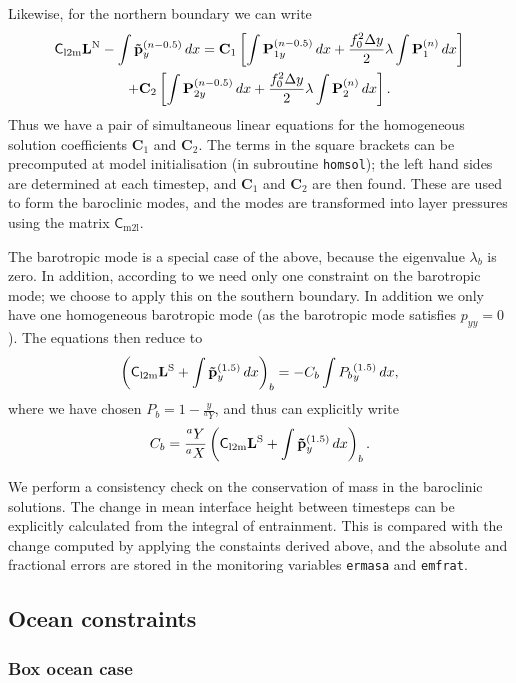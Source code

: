 \documentclass[11pt, a4paper,twoside]{article}
\newcommand{\vc}[1]{\mathbf{#1}}
\newcommand{\mtx}[1]{\vc{\mathsf{#1}}}
\newcommand{\cml}[0]{\mtx{C}_{\mathrm{m2l}}}
\newcommand{\clm}[0]{\mtx{C}_{\mathrm{l2m}}}
\numberwithin{equation}{section}
\begin{document}
Likewise, for the northern boundary we can write
\begin{multline}
\clm \vc{L}^{\textrm N} - \int \vc{\tilde{p}}_{y}^{(n-0.5)} \, dx =  \vc{C}_{1} \left[\int \vc{P}_{1y}^{(n-0.5)} \, dx + \frac{f_0^2 \Delta y}{2} \vc{\lambda} \int \vc{P}_{1}^{(n)}  \, dx\right] \\
+  \vc{C}_{2} \left[\int \vc{P}_{2y}^{(n-0.5)} \, dx  + \frac{f_0^2 \Delta y}{2} \vc{\lambda} \int \vc{P}_{2}^{(n)} \, dx \right] .
\end{multline}
Thus we have a pair of simultaneous linear equations for the homogeneous solution coefficients $\vc{C}_{1}$ and  $\vc{C}_{2}$.
The terms in the square brackets can be precomputed at model initialisation (in subroutine \verb=homsol=); the left hand sides are determined at each timestep, and  $\vc{C}_{1}$ and  $\vc{C}_{2}$ are then found.
These are used to form the baroclinic modes, and the modes are transformed into layer pressures using the matrix $\cml$.

The barotropic mode is a special case of the above, because the eigenvalue $\lambda_b$ is zero.
In addition, according to \citet{mcwilliams:77} we need only one constraint on the barotropic mode; we choose to apply this on the southern boundary.
In addition we only have one homogeneous barotropic mode (as the barotropic mode satisfies $p_{yy}=0$).
The equations then reduce to
\[\left(\clm \vc{L}^{\textrm S} + \int \vc{\tilde{p}}_{y}^{(1.5)} \, dx\right)_b =  - C_{b} \int {P_{b}}_{y}^{(1.5)} \, dx  ,\]
where we have chosen $P_b = 1-\tfrac{y}{{}^aY}$, and thus can explicitly write
\[C_{b} =  \frac{{}^aY}{{}^aX}\left(\clm \vc{L}^{\textrm S} + \int \vc{\tilde{p}}_{y}^{(1.5)} \, dx\right)_b.\]

We perform a consistency check on the conservation of mass in the baroclinic solutions.
The change in mean interface height between timesteps can be explicitly calculated from the integral of entrainment.
This is compared with the change computed by applying the constaints  derived above, and the absolute and fractional errors are stored in the monitoring variables \verb=ermasa= and \verb=emfrat=.


\subsection{Ocean constraints}\label{app:occon}

\subsubsection{Box ocean case}\label{app:boxcon}
\end{document}
